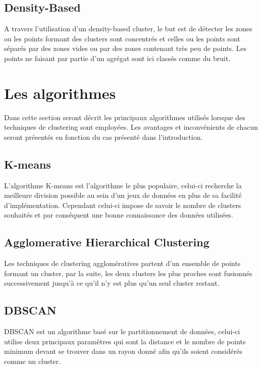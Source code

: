 \documentclass[memoire.tex]{subfiles}
\begin{document}
\subsection{Density-Based}
A travers l'utilisation d'un density-based cluster, le but est de détecter les zones ou les points formant des clusters sont concentrés et celles ou les points sont séparés par des zones vides ou par des zones contenant très peu de points. Les points ne faisant par partie d'un agrégat sont ici classés comme du bruit.


\newpage
\section{Les algorithmes}
Dans cette section seront décrit les principaux algorithmes utilisés lorsque des techniques de clustering sont employées. Les avantages et inconvénients de chacun seront présentés en fonction du cas présenté dans l'introduction.
\subsection{K-means}

L'algorithme K-means est l'algorithme le plus populaire, celui-ci recherche la meilleure division possible au sein d'un jeux de données \cite{ref5} en plus de sa facilité d'implémentation. Cependant celui-ci impose de savoir le nombre de clusters souhaités et par conséquent une bonne connaissance des données utilisées.

\subsection{Agglomerative Hierarchical Clustering}

Les techniques de clustering agglomératives partent d'un ensemble de points formant un cluster, par la suite, les deux clusters les plus proches sont fusionnés successivement jusqu'à ce qu'il n'y est plus qu'un seul cluster restant. \cite{ref4}

\subsection{DBSCAN}

DBSCAN est un algorithme basé sur le partitionnement de données, celui-ci utilise deux principaux paramètres qui sont la distance et le nombre de points minimum devant se trouver dans un rayon donné afin qu'ils soient considérés comme un cluster.
\end{document}
